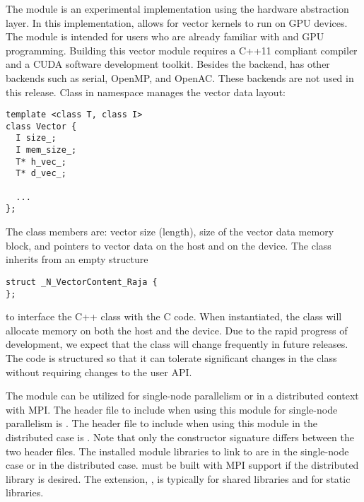 %
The {\nvecraja} module is an experimental {\nvector} implementation using the
\href{https://software.llnl.gov/RAJA/}{\raja} hardware abstraction layer.
In this implementation, {\raja}
allows for {\sundials} vector kernels to run on GPU devices. The module is intended for users
who are already familiar with {\raja} and GPU programming. Building this vector
module requires a C++11 compliant compiler and a CUDA software development toolkit.
Besides the {\cuda} backend, {\raja} has other backends such as serial, OpenMP,
and OpenAC. These backends are not used in this {\sundials} release.
Class  in namespace  manages the vector data layout:
\begin{verbatim}
template <class T, class I>
class Vector {
  I size_;
  I mem_size_;
  T* h_vec_;
  T* d_vec_;

  ...
};
\end{verbatim}
The class members are: vector size (length), size of the vector data memory block,
and pointers to vector data on the host and on the device. The class 
inherits from an empty structure
\begin{verbatim}
struct _N_VectorContent_Raja {
};
\end{verbatim}
to interface the C++ class with the {\nvector} C code. When instantiated, the class
 will allocate memory on both the host and the device. Due to the rapid
progress of {\raja} development, we expect that the 
class will change frequently in future {\sundials} releases. The code is
structured so that it can tolerate significant changes in the
 class without requiring changes to the user API.


The {\nvecraja} module can be utilized for single-node parallelism or in a distributed context with MPI.
The header file to include when using this module for single-node parallelism is .
The header file to include when using this module in the distributed case is .
Note that only the {\nvecraja} constructor signature differs between the two header files.
The installed module libraries to link to are  in the single-node case
or  in the distributed case. {\sundials} must be built with
MPI support if the distributed library is desired. The extension, , is typically  for shared libraries and  for static libraries.

